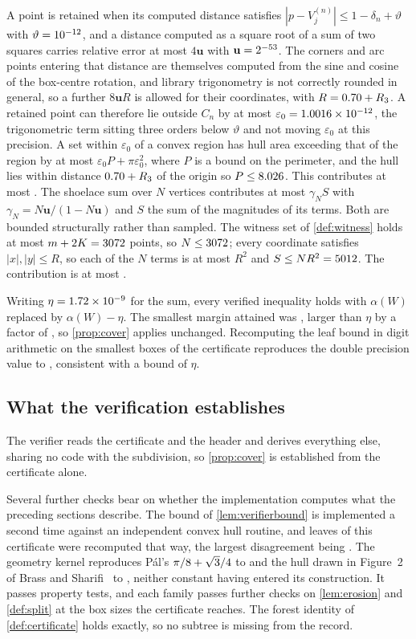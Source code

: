 \documentclass[a4paper,UKenglish,cleveref,autoref,thm-restate,numberwithinsect]{lipics-v2021}
\begin{document}
A point is retained when its computed distance satisfies
$|p-V^{(n)}_j|\le1-\delta_n+\vartheta$ with $\vartheta=10^{-12}$, and a distance
computed as a square root of a sum of two squares carries relative error at most
$4\mathbf{u}$ with $\mathbf{u}=2^{-53}$. The corners and arc points entering that
distance are themselves computed from the sine and cosine of the box-centre
rotation, and library trigonometry is not correctly rounded in general, so a
further $8\mathbf{u}R$ is allowed for their coordinates, with
$R=0.70+R_3$. A retained point can therefore lie outside $C_n$ by at most
$\varepsilon_0=1.0016\times10^{-12}$, the trigonometric term sitting three orders below
$\vartheta$ and not moving $\varepsilon_0$ at this precision. A set within $\varepsilon_0$ of a convex
region has hull area exceeding that of the region by at most
$\varepsilon_0 P+\pi\varepsilon_0^{2}$, where $P$ is a bound on the perimeter,
and the hull lies within distance $0.70+R_3$ of the origin so
$P\le8.026$. This contributes at most \ErrMembership{}. The shoelace sum
over $N$ vertices contributes at most $\gamma_N S$ with
$\gamma_N=N\mathbf{u}/(1-N\mathbf{u})$ and $S$ the sum of the magnitudes of its
terms. Both are bounded structurally rather than sampled. The witness set of
\cref{def:witness} holds at most $m+2K=3072$ points, so
$N\le3072$; every coordinate satisfies $|x|,|y|\le R$, so each of the $N$
terms is at most $R^{2}$ and $S\le NR^{2}=5012$. The contribution is at
most \ErrShoelace{}.

Writing $\eta=1.72\times10^{-9}$ for the sum, every verified inequality holds with $\alpha(W)$
replaced by $\alpha(W)-\eta$. The smallest margin attained was \WorstSlack{},
larger than $\eta$ by a factor of \SlackOverEta{}, so \cref{prop:cover} applies
unchanged. Recomputing the leaf bound in \HighPrecDigits{} digit arithmetic on the
smallest boxes of the certificate reproduces the double precision value to
\HighPrecDiff{}, consistent with a bound of $\eta$.

\subsection{What the verification establishes}

The verifier reads the certificate and the header and derives everything else,
sharing no code with the subdivision, so \cref{prop:cover} is established from the
certificate alone.

Several further checks bear on whether the implementation computes what the
preceding sections describe. The bound of \cref{lem:verifierbound} is implemented
a second time against an independent convex hull routine, and \CrossCheckLeaves{}
leaves of this certificate were recomputed that way, the largest disagreement
being \CrossCheckWorst{}. The geometry kernel reproduces P\'al's $\pi/8+\sqrt3/4$ to
\PalAgreement{} and the hull drawn in Figure~2 of Brass and
Sharifi~\cite{BrassSharifi2005} to \BSFigAgreement{}, neither constant having
entered its construction. It passes \KernelGates{} property tests, and each family
passes \AuditChecks{} further checks on \cref{lem:erosion} and \cref{def:split} at
the box sizes the certificate reaches. The forest identity of
\cref{def:certificate} holds exactly, so no subtree is missing from the record.
\end{document}
